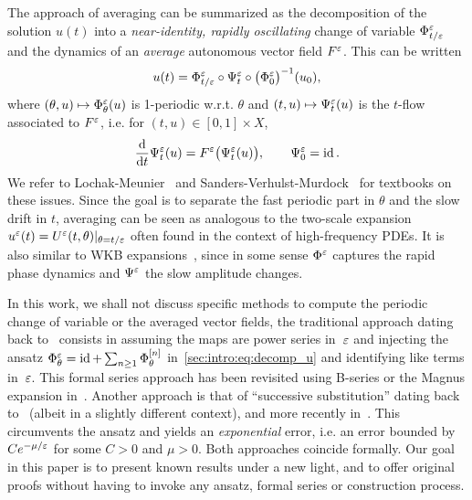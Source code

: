 The approach of averaging can be summarized as the decomposition of the
solution \( u(t) \) into a \textit{near-identity, rapidly oscillating}
change of variable \(\Phi^{\varepsilon}_{t/\varepsilon} \) and the dynamics of an
\textit{average} autonomous vector field \( F^{\varepsilon} \). This can be written
\begin{equation} \label{sec:intro:eq:decomp_u}
  u(t) = \Phi^{\varepsilon}_{t/\varepsilon} \circ \Psi^{\varepsilon}_t \circ 
    \big( \Phi^{\varepsilon}_0 \big)^{-1} (u_0), 
\end{equation}
where \( (\theta,u) \mapsto \Phi^{\varepsilon}_\theta(u) \) is 1-periodic w.r.t.
\( \theta \) and \( (t,u) \mapsto \Psi^{\varepsilon}_t(u) \) is the $t$-flow
associated to \( F^{\varepsilon} \), i.e. for $(t,u) \in [0,1] \times X$, 
\begin{equation}
  \frac{\mathrm{d}}{\mathrm{d} t} \Psi^{\varepsilon}_t(u) = F^{\varepsilon} \big( \Psi^{\varepsilon}_t(u) \big) ,
  \qquad \Psi^{\varepsilon}_0 = \operatorname{id} . 
\end{equation}
We refer to Lochak-Meunier~\cite{lochak.1988.multiphase} and
Sanders-Verhulst-Murdock~\cite{sanders.2007.averaging} for textbooks on
these issues. Since the goal is to separate the fast periodic part in
$\theta$ and the slow drift in $t$, averaging can be seen as analogous
to the two-scale expansion $u^{\varepsilon}(t) = U^{\varepsilon}(t, \theta) |_{\theta =
t/\varepsilon}$ often found in the context of high-frequency PDEs. It
is also similar to WKB expansions~\cite{wentzel.1926.eine,kramers.1926.wellenmechanik,brillouin.1926.remarques}, since in some sense $\Phi^{\varepsilon}$
captures the rapid phase dynamics and $\Psi^{\varepsilon}$ the slow amplitude
changes. 

In this work, we shall not discuss specific methods to compute the
periodic change of variable or the averaged vector fields, the traditional
approach dating back to~\cite{perko.1969.higher} consists in assuming the
maps are power series in~$\varepsilon$ and injecting the ansatz $\Phi^{\varepsilon}_\theta
= \operatorname{id} + \sum_{n \geq 1} \Phi^{[n]}_{\theta}$
in~\eqref{sec:intro:eq:decomp_u} and identifying like terms in~$\varepsilon$.
This formal series approach has been revisited using B-series or the
Magnus expansion in~\cite{chartier.2010.higher,
chartier.2012.formal, casas.2019.continuous}.
%
Another approach is that of ``successive substitution'' dating back
to~\cite{neishtadt.1984.separation} (albeit in a slightly different
context), and more recently in~\cite{castella.2015.stroboscopic,
chartier.2020.new}. This circumvents the ansatz and yields an
\textit{exponential} error, i.e. an error bounded by $Ce^{-\mu/\varepsilon}$
for some $C > 0$ and $\mu > 0$. Both approaches coincide formally. 
%
Our goal in this paper is to present known results under a new light,
and to offer original proofs without having to invoke any ansatz, formal
series or construction process. 


